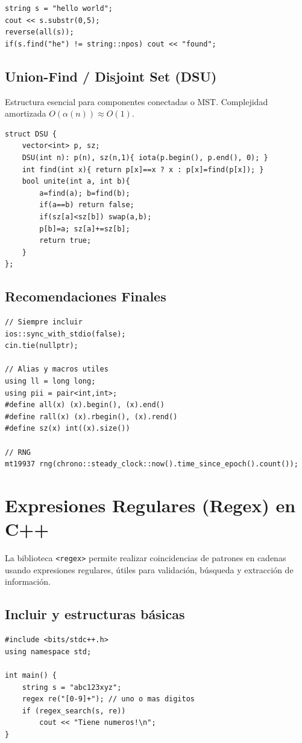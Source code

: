 \documentclass{article}
\begin{document}
\begin{lstlisting}[style=cppstyle]
string s = "hello world";
cout << s.substr(0,5);
reverse(all(s));
if(s.find("he") != string::npos) cout << "found";
\end{lstlisting}


\subsection{Union-Find / Disjoint Set (DSU)}

Estructura esencial para componentes conectadas o MST.  
Complejidad amortizada \(O(\alpha(n)) \approx O(1)\).

\begin{lstlisting}[style=cppstyle]
struct DSU {
    vector<int> p, sz;
    DSU(int n): p(n), sz(n,1){ iota(p.begin(), p.end(), 0); }
    int find(int x){ return p[x]==x ? x : p[x]=find(p[x]); }
    bool unite(int a, int b){
        a=find(a); b=find(b);
        if(a==b) return false;
        if(sz[a]<sz[b]) swap(a,b);
        p[b]=a; sz[a]+=sz[b];
        return true;
    }
};
\end{lstlisting}


\subsection{Recomendaciones Finales}

\begin{lstlisting}[style=cppstyle]
// Siempre incluir
ios::sync_with_stdio(false);
cin.tie(nullptr);

// Alias y macros utiles
using ll = long long;
using pii = pair<int,int>;
#define all(x) (x).begin(), (x).end()
#define rall(x) (x).rbegin(), (x).rend()
#define sz(x) int((x).size())

// RNG
mt19937 rng(chrono::steady_clock::now().time_since_epoch().count());
\end{lstlisting}

\section{Expresiones Regulares (Regex) en C++}

La biblioteca \lstinline|<regex>| permite realizar coincidencias de patrones en cadenas usando expresiones regulares, útiles para validación, búsqueda y extracción de información.

\subsection{Incluir y estructuras básicas}
\begin{lstlisting}[style=cppstyle]
#include <bits/stdc++.h>
using namespace std;

int main() {
    string s = "abc123xyz";
    regex re("[0-9]+"); // uno o mas digitos
    if (regex_search(s, re))
        cout << "Tiene numeros!\n";
}
\end{lstlisting}
\end{document}
